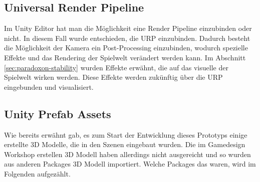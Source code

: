 \subsection{Universal Render Pipeline}
Im Unity Editor hat man die Möglichkeit eine Render Pipeline einzubinden oder nicht. In diesem Fall wurde entschieden, die \ac{URP} einzubinden. Dadurch besteht die Möglichkeit der Kamera ein Post-Processing einzubinden, wodurch spezielle Effekte und das Rendering der Spielwelt verändert werden kann. Im Abschnitt \ref{sec:paradoxon-stability}  wurden Effekte erwähnt, die auf das visuelle der Spielwelt wirken werden. Diese Effekte werden zukünftig über die \ac{URP} eingebunden und visualisiert.

\subsection{Unity Prefab Assets}\label{sec:extra-assets}
Wie bereits erwähnt gab, es zum Start der Entwicklung dieses Prototyps einige erstellte \ac{3D} Modelle, die in den Szenen eingebaut wurden. Die im Gamedesign Workshop erstellen \ac{3D} Modell haben allerdings nicht ausgereicht und so wurden aus anderen Packages \ac{3D} Modell importiert. Welche Packages das waren, wird im Folgenden aufgezählt.




